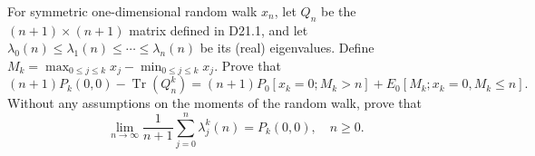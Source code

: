 For symmetric one-dimensional random walk \(x_n\), let \(Q_n\) be the \((n+1) \times (n+1)\) matrix defined in D21.1, and let \(\lambda_0(n) \leq \lambda_1(n) \leq \cdots \leq \lambda_n(n)\) be its (real) eigenvalues. Define \(M_k = \max_{0 \leq j \leq k} x_j - \min_{0 \leq j \leq k} x_j\). Prove that
\[
(n+1)P_k(0,0) - \operatorname{Tr}(Q_n^k) = (n+1)P_0[x_k = 0; M_k > n] + E_0[M_k; x_k = 0, M_k \leq n].
\]
Without any assumptions on the moments of the random walk, prove that
\[
\lim_{n \to \infty} \frac{1}{n+1} \sum_{j=0}^{n} \lambda_j^k(n) = P_k(0,0), \quad n \geq 0.
\]
